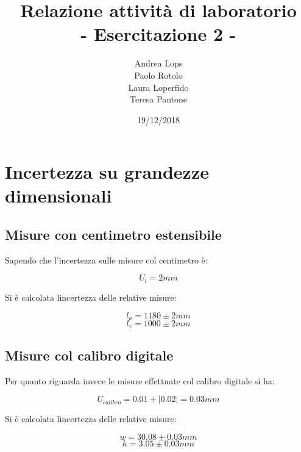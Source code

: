 \documentclass[a4paper]{article}
\title{\textbf{Relazione attività di laboratorio}\\{\normalsize - Esercitazione 2 -}}
\author{Andrea Lops\\
		Paolo Rotolo\\
		Laura Loperfido\\
		Teresa Pantone
	   }
\date{19/12/2018}
\begin{document}
\maketitle

\section {Incertezza su grandezze dimensionali}
\subsection{Misure con centimetro estensibile}
Sapendo che l'incertezza sulle misure col centimetro è:
\begin{Large} 
	\begin{equation}
		U_{l} = 2mm
	 \end{equation}
\end{Large}
Si è calcolata lincertezza delle relative misure: 
\begin{Large} 
	\begin{equation}
		l_a = 1180\pm2mm
	 \end{equation}
	 \begin{equation}
		l_v = 1000\pm2mm
	 \end{equation}
\end{Large}
\subsection{Misure col calibro digitale}
Per quanto riguarda invece le misure effettuate col calibro digitale si ha: 
\begin{Large} 
	\begin{equation}
		U_{calibro} = 0.01 + |0.02| = 0.03mm
	 \end{equation}
\end{Large}
Si è calcolata lincertezza delle relative misure: 
\begin{Large} 
	\begin{equation}
		w = 30.08\pm0.03mm
	 \end{equation}
	 \begin{equation}
		h = 3.05\pm0.03mm
	 \end{equation}
\end{Large}
\end{document}
